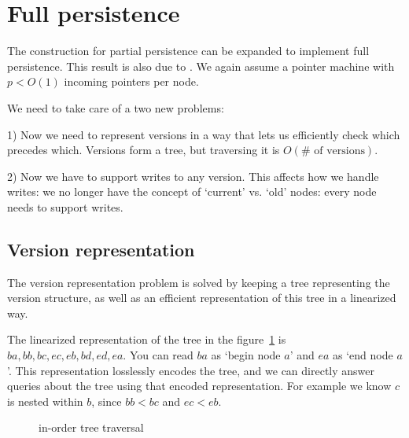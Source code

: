 \documentclass[11pt]{article}
\begin{document}
\section{Full persistence}
The construction for partial persistence can be expanded to implement full persistence. This result is also due to \cite{dsst}. We again assume a pointer machine with $p <  O(1)$ incoming pointers per node. 

We need to take care of a two new problems: 

1) Now we need  to represent versions in a way that lets us efficiently check which precedes which. Versions form a tree, but traversing it is \(O(\mbox{\#~of~versions})\). 

2) Now we have to support writes to any version. This affects how we handle writes: we no longer have the concept of `current' vs. `old' nodes: every node needs to support writes. 

\subsection{Version representation}

The version representation problem is solved by keeping a tree representing the version structure, as well as an efficient representation of this tree in a linearized way. 

The linearized representation of the tree in the figure~\ref{tree-traversal} is \(ba, bb, bc, ec, eb, bd, ed, ea\). You can read $ba$ as `begin node $a$' and $ea$ as `end node $a$'.  This representation losslessly encodes the tree,  and we can directly answer queries about the tree using that encoded representation. For example we know $c$ is nested within $b$, since \(bb < bc\)  and \(ec < eb\). 

\begin{figure}[h]
  \begin{center}
  \end{center}
  \caption{\small in-order tree traversal}
  \label{tree-traversal}
\end{figure}
\end{document}
